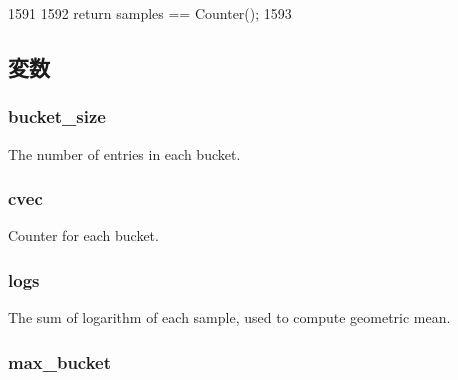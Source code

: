\begin{DoxyCode}
1591     {
1592         return samples == Counter();
1593     }
\end{DoxyCode}


\subsection{変数}
\hypertarget{classStats_1_1HistStor_acf3483d9fb89e37ad01724a4428b3dd2}{
\subsubsection[{bucket\_\-size}]{ {\bf bucket\_\-size}}}
\label{classStats_1_1HistStor_acf3483d9fb89e37ad01724a4428b3dd2}
The number of entries in each bucket. \hypertarget{classStats_1_1HistStor_a8cc2f3a565a2e54ab797f717802bc894}{
\subsubsection[{cvec}]{ {\bf cvec}}}
\label{classStats_1_1HistStor_a8cc2f3a565a2e54ab797f717802bc894}
Counter for each bucket. \hypertarget{classStats_1_1HistStor_a8bbd10a9b5009b4ca5f2709c9dfcb684}{
\subsubsection[{logs}]{ {\bf logs}}}
\label{classStats_1_1HistStor_a8bbd10a9b5009b4ca5f2709c9dfcb684}
The sum of logarithm of each sample, used to compute geometric mean. \hypertarget{classStats_1_1HistStor_aed6ecbe61a17b3a0ef319655805a77d9}{
\subsubsection[{max\_\-bucket}]{ {\bf max\_\-bucket}}}
